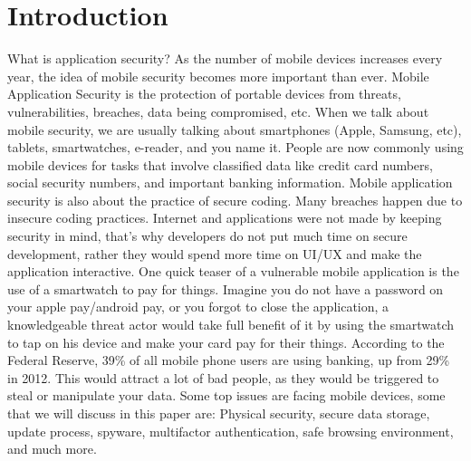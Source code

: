 \documentclass{article}
\begin{document}
\section{Introduction}
What is application security? As the number of mobile devices increases every year, the idea of mobile security becomes more important than ever. Mobile Application Security is the protection of portable devices from threats, vulnerabilities, breaches, data being compromised, etc. When we talk about mobile security, we are usually talking about smartphones (Apple, Samsung, etc), tablets, smartwatches, e-reader, and you name it. People are now commonly using mobile devices for tasks that involve classified data like credit card numbers, social security numbers, and important banking information. Mobile application security is also about the practice of secure coding. Many breaches happen due to insecure coding practices. Internet and applications were not made by keeping security in mind, that’s why developers do not put much time on secure development, rather they would spend more time on UI/UX and make the application interactive. One quick teaser of a vulnerable mobile application is the use of a smartwatch to pay for things. Imagine you do not have a password on your apple pay/android pay, or you forgot to close the application, a knowledgeable threat actor would take full benefit of it by using the smartwatch to tap on his device and make your card pay for their things. According to the Federal Reserve, 39\% of all mobile phone users are using banking, up from 29\% in 2012. This would attract a lot of bad people, as they would be triggered to steal or manipulate your data. Some top issues are facing mobile devices, some that we will discuss in this paper are: Physical security, secure data storage, update process, spyware, multifactor authentication, safe browsing environment, and much more.
\vspace{100mm}
\end{document}
